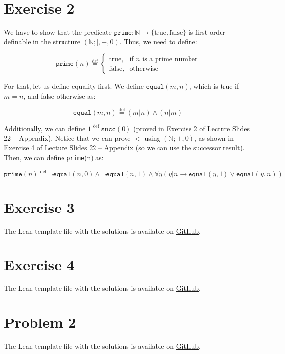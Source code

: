 \documentclass[11pt]{article}
\begin{document}
\section*{Exercise 2}

We have to show that the predicate $\texttt{prime}: \mathbb{N} \to \{\text{true}, \text{false}\}$ is first order definable in the structure $(\mathbb{N}; |, +, 0)$. Thus, we need to define:

\begin{equation*}
    \texttt{prime}(n) \stackrel{\text{def}}{=} 
    \begin{cases}
        \text{true,} & \text{if } n \text{ is a prime number} \\
        \text{false,} & \text{otherwise}
    \end{cases}
\end{equation*}

For that, let us define equality first. We define $\texttt{equal}(m, n)$, which is true if $m = n$, and false otherwise as:

$$\texttt{equal}(m, n) \stackrel{\text{def}}{=} (m | n) \land (n | m)$$

Additionally, we can define $1 \stackrel{\text{def}}{=} \texttt{succ}(0)$ (proved in Exercise 2 of Lecture Slides 22 -- Appendix). Notice that we can prove $<$ using $(\mathbb{N}; +, 0)$, as shown in Exercise 4 of  Lecture Slides 22 -- Appendix (so we can use the successor result). Then, we can define \texttt{prime}(n) as:

$$\texttt{prime}(n)\stackrel{\text{def}}{=} \lnot \texttt{equal}(n, 0)\land \lnot \texttt{equal}(n, 1) \land \forall y (y | n \to \texttt{equal}(y, 1) \lor \texttt{equal}(y, n))$$


\section*{Exercise 3}
The Lean template file with the solutions is available on \href{https://github.com/lucastassis/BU-CS511/blob/main/HW06/code/HW06.lean}{GitHub}.

\section*{Exercise 4}
The Lean template file with the solutions is available on \href{https://github.com/lucastassis/BU-CS511/blob/main/HW06/code/HW06.lean}{GitHub}.

\section*{Problem 2}
The Lean template file with the solutions is available on \href{https://github.com/lucastassis/BU-CS511/blob/main/HW06/code/HW06.lean}{GitHub}.
\end{document}
